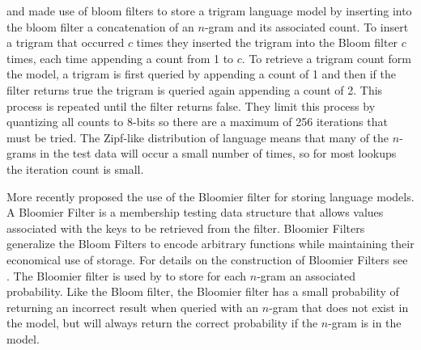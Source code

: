 \documentclass[10pt, a4paper]{article}
\begin{document}
 and  made use of bloom filters to store a trigram language model by inserting into the bloom filter a concatenation of an $n$-gram and its associated count.  To insert a trigram that occurred $c$ times they inserted the trigram into the Bloom filter $c$ times, each time appending a count from 1 to $c$.  To retrieve a trigram count form the model, a trigram is first queried by appending a count of 1 and then if the filter returns true the trigram is queried again appending a count of 2.  This process is repeated until the filter returns false.  They limit this process by quantizing all counts to 8-bits so there are a maximum of 256 iterations that must be tried.  The Zipf-like distribution of language means that many of the $n$-grams in the test data will occur a small number of times, so for most lookups the iteration count is small. 

More recently  proposed the use of the Bloomier filter for storing language models.  A Bloomier Filter \cite{bloomier} is a membership testing data structure that allows values associated with the keys to be retrieved from the filter.  Bloomier Filters generalize the Bloom Filters to encode arbitrary functions while maintaining their economical use of storage.  For details on the construction of Bloomier Filters see .  The Bloomier filter is used by  to store for each $n$-gram an associated probability.  Like the Bloom filter, the Bloomier filter has a small probability of returning an incorrect result when queried with an $n$-gram that does not exist in the model, but will always return the correct probability if the $n$-gram is in the model.
\end{document}
